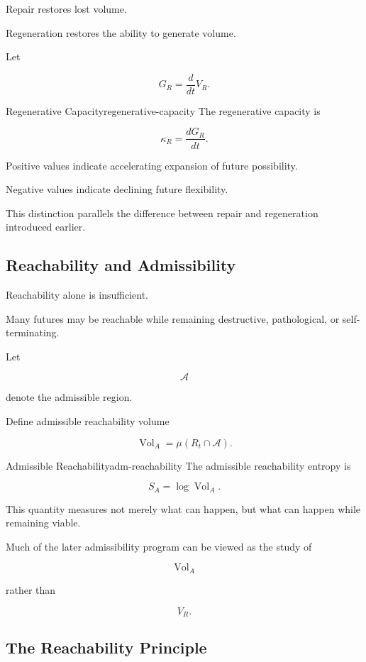 \documentclass[12pt,twoside,openright]{book}
\newcommand{\Vol}{\operatorname{Vol}}
\begin{document}
Repair restores lost volume.

Regeneration restores the ability to generate volume.

Let

\[
G_R
=

\frac{d}{dt}
V_R.
\]

\begin{definition}{Regenerative Capacity}{regenerative-capacity}
The regenerative capacity is

\[
\kappa_R
=

\frac{dG_R}{dt}.
\]
\end{definition}

Positive values indicate accelerating expansion of future
possibility.

Negative values indicate declining future flexibility.

This distinction parallels the difference between repair
and regeneration introduced earlier.

\subsection{Reachability and Admissibility}

Reachability alone is insufficient.

Many futures may be reachable while remaining destructive,
pathological, or self-terminating.

Let

\[
\mathcal A
\]

denote the admissible region.

Define admissible reachability volume

\[
\Vol_A
=

\mu(R_t\cap\mathcal A).
\]

\begin{definition}{Admissible Reachability}{adm-reachability}
The admissible reachability entropy is

\[
S_A
=

\log\Vol_A.
\]
\end{definition}

This quantity measures not merely what can happen, but
what can happen while remaining viable.

Much of the later admissibility program can be viewed as
the study of

\[
\Vol_A
\]

rather than

\[
V_R.
\]

\subsection{The Reachability Principle}
\end{document}

